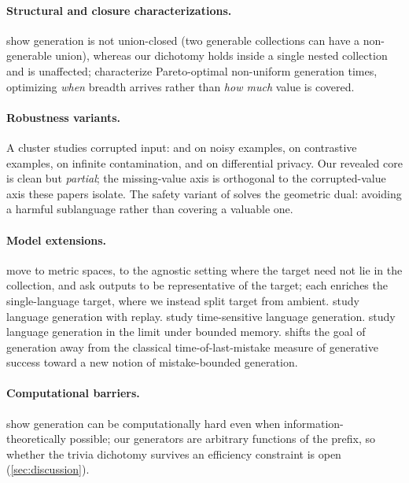 \documentclass[11pt]{article}
\numberwithin{equation}{section}
\theoremstyle{plain}
\theoremstyle{definition}
\theoremstyle{remark}
\begin{document}
\paragraph{Structural and closure characterizations.}
 show generation is not union-closed (two generable collections can
have a non-generable union), whereas our dichotomy holds inside a single nested collection and
is unaffected; \citet{charikar2025pareto} characterize Pareto-optimal non-uniform generation
times, optimizing \emph{when} breadth arrives rather than \emph{how much} value is covered.

\paragraph{Robustness variants.}
A cluster studies corrupted input: \citet{raman2025noisy} and \citet{li2026quantifying} on
noisy examples, \citet{li2026contrastive} on contrastive examples,
\citet{mehrotra2025contamination} on infinite contamination, \citet{mehrotra2026private} and
\citet{li26dp} on differential privacy. Our revealed core is clean but \emph{partial}; the
missing-value axis is orthogonal to the corrupted-value axis these papers isolate. The safety
variant of \citet{anastasopoulos2026safe} solves the geometric dual: avoiding a harmful
sublanguage rather than covering a valuable one.

\paragraph{Model extensions.}
 move to metric spaces, \citet{hogsgaard2026agnostic} to the agnostic
setting where the target need not lie in the collection, and \citet{peale2025representative}
ask outputs to be representative of the target; each enriches the single-language target,
where we instead split target from ambient. \cite{racca2026language} study language generation
with replay. \cite{ganju2026timely} study time-sensitive language generation.
\citet{kleinberg2026memory} study language generation in the limit under bounded memory.
\citet{kleinberg2026mistake} shifts the goal of generation away from the classical
time-of-last-mistake measure of generative success toward a new notion of mistake-bounded
generation.

\paragraph{Computational barriers.}
\citet{arenas2025complexity} show generation can be computationally hard even when
information-theoretically possible; our generators are arbitrary functions of the prefix, so
whether the trivia dichotomy survives an efficiency constraint is open
(\cref{sec:discussion}).
\end{document}
